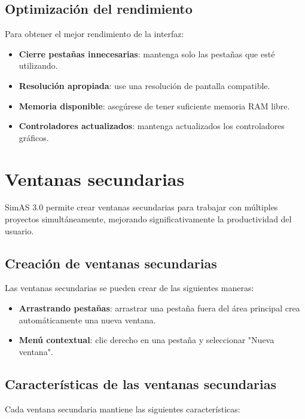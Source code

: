 \subsection{Optimización del rendimiento}

Para obtener el mejor rendimiento de la interfaz:

\begin{itemize}
    \item \textbf{Cierre pestañas innecesarias}: mantenga solo las pestañas que esté utilizando.
    \item \textbf{Resolución apropiada}: use una resolución de pantalla compatible.
    \item \textbf{Memoria disponible}: asegúrese de tener suficiente memoria RAM libre.
    \item \textbf{Controladores actualizados}: mantenga actualizados los controladores gráficos.
\end{itemize}

\section{Ventanas secundarias}

SimAS 3.0 permite crear ventanas secundarias para trabajar con múltiples proyectos simultáneamente, mejorando significativamente la productividad del usuario.

\subsection{Creación de ventanas secundarias}

Las ventanas secundarias se pueden crear de las siguientes maneras:

\begin{itemize}
    \item \textbf{Arrastrando pestañas}: arrastrar una pestaña fuera del área principal crea automáticamente una nueva ventana.
    \item \textbf{Menú contextual}: clic derecho en una pestaña y seleccionar \string"Nueva ventana\string".
\end{itemize}

\subsection{Características de las ventanas secundarias}

Cada ventana secundaria mantiene las siguientes características:


